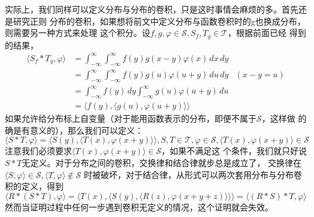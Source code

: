 \documentclass{ctexbook}
\begin{document}
实际上，我们同样可以定义分布与分布的卷积，只是这时事情会麻烦的多。首先还是研究正则
分布的卷积，如果想将前文中定义分布与函数卷积时的g也换成分布，则需要另一种方式来处理
这个积分。设$f,g,\varphi\in\mathcal{S} ,S_f,T_g\in\mathcal{T} $，根据前面已经
得到的结果，
\begin{align*}
    \langle S_f *T_g,\varphi\rangle & =\int_{-\infty}^{\infty}\int_{-\infty}^{\infty}f(y)g(x-y)\varphi(x)\,dx\,dy           \\
                                    & =\int_{-\infty}^{\infty}\int_{-\infty}^{\infty}f(y)g(u)\varphi(u+y)\,du\,dy & (x-y=u) \\
                                    & =\int_{-\infty}^{\infty}f(y)\,dy\int_{-\infty}^{\infty}g(u)\varphi(u+y)\,du           \\
                                    & =\langle f(y),\langle g(u),\varphi(u+y)\rangle\rangle
\end{align*}
如果允许给分布标上自变量（对于能用函数表示的分布，即便不属于$\mathcal{S} $，这样做
的确是有意义的），那么我们可以定义：
\begin{equation}
    \langle S*T,\varphi\rangle=\langle S(y),\langle T(x),\varphi(x+y)\rangle\rangle,S,T\in\mathcal{T} ,\varphi\in\mathcal{S} ,\langle T(x),\varphi(x+y)\rangle\in\mathcal{S}
\end{equation}
注意我们必须要求$\langle T(x),\varphi(x+y)\rangle\in\mathcal{S}$，如果不满足这
个条件，我们就只好说$S*T$无定义。对于分布之间的卷积，交换律和结合律就步总是成立了，
交换律在$\langle S,\varphi\rangle\in\mathcal{S} ,\langle T,\varphi\rangle\notin\mathcal{S}$
时被破坏，对于结合律，从形式可以两次套用分布与分布卷积的定义，得到
\begin{equation*}
    \langle R*(S*T),\varphi\rangle=\langle T(x),\langle S(y),\langle R(z),\varphi(x+y+z)\rangle\rangle\rangle=\langle (R*S)*T,\varphi\rangle
\end{equation*}
然而当证明过程中任何一步遇到卷积无定义的情况，这个证明就会失效。
\end{document}

